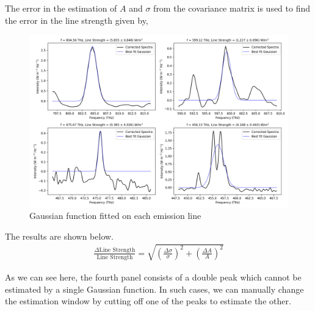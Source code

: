 The error in the estimation of $A$ and $\sigma$ from the covariance matrix is used to find the error in the line strength given by,

\begin{figure}[H]
    \centering
    \includegraphics[width=0.9\linewidth]{Figures/3/peaks_zoom_fit.png}
    \caption{Gaussian function fitted on each emission line}
\end{figure}

The results are shown below.
\begin{align}
    \frac{\Delta \text{Line Strength}}{\text{Line Strength}} = \sqrt{\left(\frac{\Delta \sigma}{\sigma}\right)^2 + \left(\frac{\Delta A}{A}\right)^2}
\end{align}

As we can see here, the fourth panel consists of a double peak which cannot be estimated by a single Gaussian function. In such cases, we can manually change the estimation window by cutting off one of the peaks to estimate the other.

